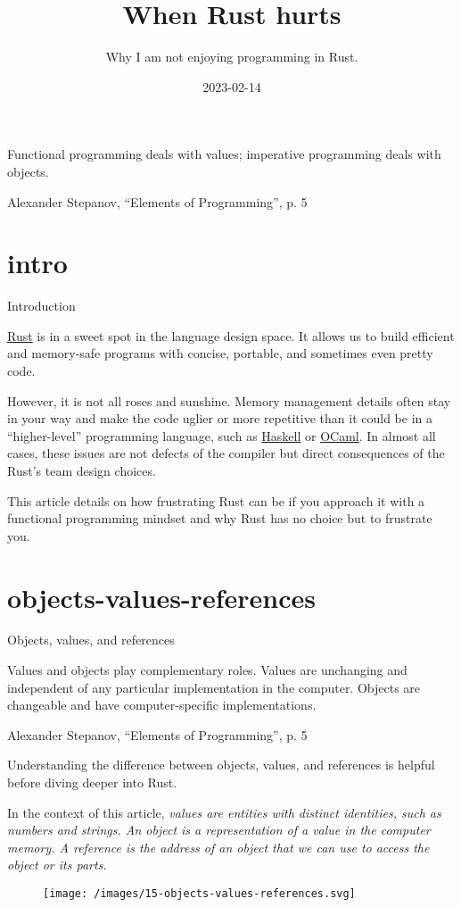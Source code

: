 \documentclass{article}
\title{When Rust hurts}
\subtitle{Why I am not enjoying programming in Rust.}
\date{2023-02-14}
\begin{document}
\epigraph{
  Functional programming deals with values; imperative programming deals with objects.
}{Alexander Stepanov, ``Elements of Programming'', p. 5}

\section{intro}{Introduction}

\href{https://www.rust-lang.org/}{Rust} is in a sweet spot in the language design space.
It allows us to build efficient and memory-safe programs with concise, portable, and sometimes even pretty code.

However, it is not all roses and sunshine.
Memory management details often stay in your way and make the code uglier or more repetitive than it could be in a ``higher-level'' programming language, such as \href{https://www.haskell.org/}{Haskell} or \href{https://ocaml.org}{OCaml}.
In almost all cases, these issues are not defects of the compiler but direct consequences of the Rust's team design choices.

This article details on how frustrating Rust can be if you approach it with a functional programming mindset and why Rust has no choice but to frustrate you.

\section{objects-values-references}{Objects, values, and references}
\epigraph{
    Values and objects play complementary roles.
    Values are unchanging and independent of any particular implementation in the computer.
    Objects are changeable and have computer-specific implementations.
}{Alexander Stepanov, ``Elements of Programming'', p. 5}

Understanding the difference between objects, values, and references is helpful before diving deeper into Rust.

In the context of this article, \em{values} are entities with distinct identities, such as numbers and strings.
An \em{object} is a representation of a value in the computer memory.
A \em{reference} is the address of an object that we can use to access the object or its parts.

\begin{figure}[grayscale-diagram]
\texttt{[image: /images/15-objects-values-references.svg]}
\end{figure}
\end{document}
